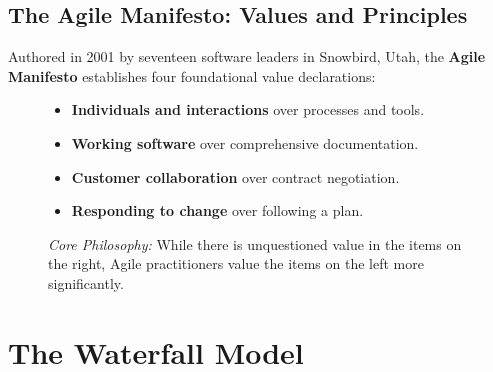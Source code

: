 \subsection{The Agile Manifesto: Values and Principles}
Authored in 2001 by seventeen software leaders in Snowbird, Utah, the \textbf{Agile Manifesto} establishes four foundational value declarations:
\begin{figure}[htbp]
\centering
\begin{tcolorbox}[colback=codebg, colframe=primary, title=\textbf{The Four Value Statements of the Agile Manifesto}]
\begin{itemize}
    \item \textbf{Individuals and interactions} over processes and tools.
    \item \textbf{Working software} over comprehensive documentation.
    \item \textbf{Customer collaboration} over contract negotiation.
    \item \textbf{Responding to change} over following a plan.
\end{itemize}
\textit{Core Philosophy:} While there is unquestioned value in the items on the right, Agile practitioners value the items on the left more significantly.
\end{tcolorbox}
\end{figure}

\section{The Waterfall Model}
\label{sec:se_waterfall}

